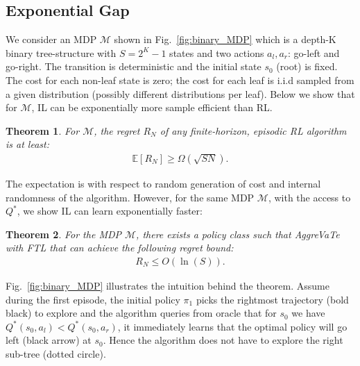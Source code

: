 \documentclass{article}
\newtheorem{theorem}{Theorem}[section]
\begin{document}
\subsection{Exponential Gap}
\label{sec:special_mdp}
We consider an MDP $\mathcal{M}$ shown in Fig.~\ref{fig:binary_MDP} which is a depth-K binary tree-structure with $S = 2^K-1$ states and two actions ${a_l, a_r}$:  go-left and go-right. The transition is deterministic and the initial state $s_0$ (root) is fixed. The cost for each non-leaf state is zero; the cost for each leaf is i.i.d sampled from a given distribution (possibly different distributions per leaf).  Below we show that for $\mathcal{M}$, IL can be exponentially more sample efficient than RL.
\begin{theorem}
\label{them:special_lower}
For $\mathcal{M}$, the regret $R_N$ of any finite-horizon, episodic RL algorithm is at least:
\begin{align}
\mathbb{E}[R_N] \geq \Omega(\sqrt{SN}).
\end{align} 
\end{theorem} The expectation is with respect to random generation of cost and internal randomness of the algorithm. However, for the same MDP $\mathcal{M}$, with the access to $Q^*$, we show IL can learn exponentially faster:%
\begin{theorem}
\label{them:special_upper}
For the MDP ${\mathcal{M}}$, there exists a policy class such that AggreVaTe with FTL that can achieve the following regret bound:
\begin{align}
R_N \leq O(\ln{(S)}).
\end{align}
\end{theorem}
Fig.~\ref{fig:binary_MDP} illustrates the intuition behind the theorem. Assume during the first episode, the initial policy $\pi_1$ picks the rightmost trajectory (bold black) to explore and the algorithm queries from oracle that for $s_0$ we have $Q^*(s_0,a_l)<Q^*(s_0,a_r)$, it immediately learns that the optimal policy will go left (black arrow) at $s_0$. Hence the algorithm does not have to explore the right sub-tree (dotted circle).
\end{document}
